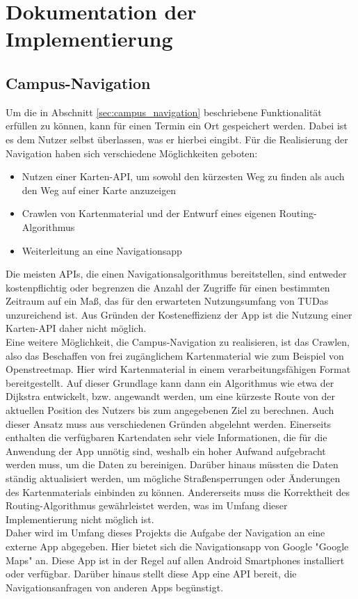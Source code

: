 \documentclass[noindent]{tudreport}
\begin{document}
	\chapter{Dokumentation der Implementierung}\label{chap:documentation}
		\section{Campus-Navigation}
			Um die in Abschnitt \ref{sec:campus_navigation} beschriebene Funktionalität erfüllen zu können, kann für einen Termin ein Ort gespeichert werden. Dabei ist es dem Nutzer selbst überlassen, was er hierbei eingibt. Für die Realisierung der Navigation haben sich verschiedene Möglichkeiten geboten:
			\begin{itemize}
			\item Nutzen einer Karten-API, um sowohl den kürzesten Weg zu finden als auch den Weg auf einer Karte anzuzeigen
			
			\item Crawlen von Kartenmaterial und der Entwurf eines eigenen Routing-Algorithmus
			
			\item Weiterleitung an eine Navigationsapp
			\end{itemize}
			
			Die meisten APIs, die einen Navigationsalgorithmus bereitstellen, sind entweder kostenpflichtig oder begrenzen die Anzahl der Zugriffe für einen bestimmten Zeitraum auf ein Maß, das für den erwarteten Nutzungsumfang von TUDas unzureichend ist. Aus Gründen der Kosteneffizienz der App ist die Nutzung einer Karten-API daher nicht möglich.\\
			Eine weitere Möglichkeit, die Campus-Navigation zu realisieren, ist das Crawlen, also das Beschaffen von frei zugänglichem Kartenmaterial wie zum Beispiel von Openstreetmap. %
			Hier wird Kartenmaterial in einem verarbeitungsfähigen Format bereitgestellt. Auf dieser Grundlage kann dann ein Algorithmus wie etwa der Dijkstra entwickelt, bzw. angewandt werden, um eine kürzeste Route von der aktuellen Position des Nutzers bis zum angegebenen Ziel zu berechnen. Auch dieser Ansatz muss aus verschiedenen Gründen abgelehnt werden. Einerseits enthalten die verfügbaren Kartendaten sehr viele Informationen, die für die Anwendung der App unnötig sind, weshalb ein hoher Aufwand aufgebracht werden muss, um die Daten zu bereinigen. Darüber hinaus müssten die Daten ständig aktualisiert werden, um mögliche Straßensperrungen oder Änderungen des Kartenmaterials einbinden zu können. Andererseits muss die Korrektheit des Routing-Algorithmus gewährleistet werden, was im Umfang dieser Implementierung nicht möglich ist.\\
			Daher wird im Umfang dieses Projekts die Aufgabe der Navigation an eine externe App abgegeben. Hier bietet sich die Navigationsapp von Google "Google Maps" an. Diese App ist in der Regel auf allen Android Smartphones installiert oder verfügbar. Darüber hinaus stellt diese App eine API bereit, die Navigationsanfragen von anderen Apps begünstigt.
			
\end{document}

